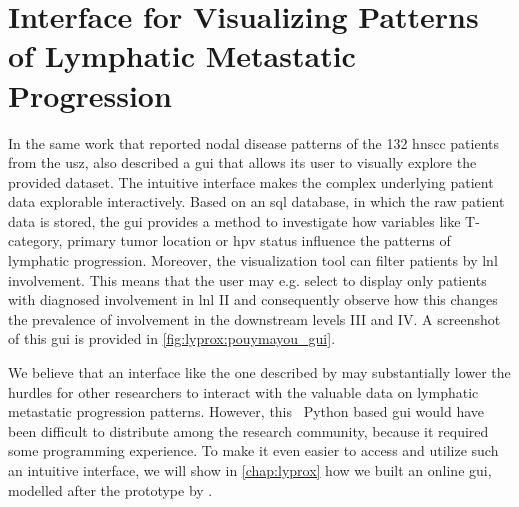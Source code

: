 \documentclass[\relativeRoot/main.tex]{subfiles}
\begin{document}
\section[Interface for Visualizing Patterns of Progression]{Interface for Visualizing Patterns\\of Lymphatic Metastatic Progression}
\label{sec:previous_work:prototype_gui}

In the same work that reported nodal disease patterns of the 132 \gls{hnscc} patients from the \gls{usz},  also described a \gls{gui} that allows its user to visually explore the provided dataset. The intuitive interface makes the complex underlying patient data explorable interactively. Based on an \acrshort{sql} database, in which the raw patient data is stored, the \gls{gui} provides a method to investigate how variables like T-category, primary tumor location or \gls{hpv} status influence the patterns of lymphatic progression. Moreover, the visualization tool can filter patients by \gls{lnl} involvement. This means that the user may e.g. select to display only patients with diagnosed involvement in \gls{lnl} II and consequently observe how this changes the prevalence of involvement in the downstream levels III and IV. A screenshot of this \gls{gui} is provided in \cref{fig:lyprox:pouymayou_gui}.

We believe that an interface like the one described by  may substantially lower the hurdles for other researchers to interact with the valuable data on lymphatic metastatic progression patterns. However, this ~Python based \gls{gui} would have been difficult to distribute among the research community, because it required some programming experience. To make it even easier to access and utilize such an intuitive interface, we will show in \cref{chap:lyprox} how we built an online \gls{gui}, modelled after the prototype by .
\end{document}
